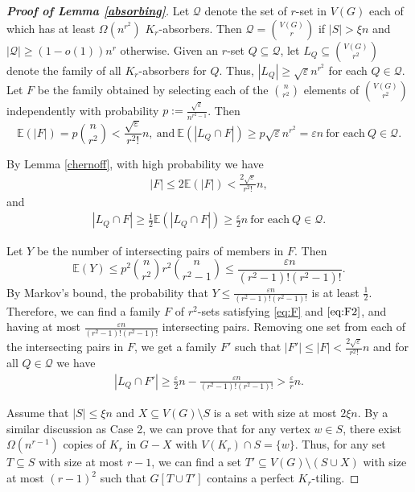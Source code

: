 \documentclass[11pt, a4paper]{article}
\theoremstyle{definition}
\newcommand{\eps}{\varepsilon}
\newcommand{\<}{\subseteq}
\begin{document}
\begin{proof}[\bf Proof of Lemma \ref{absorbing}]
Let $\mathcal{Q}$ denote the set of $r$-set in $V(G)$ each of which has at least $\Omega(n^{r^2})$ $K_r$-absorbers. Then $\mathcal{Q}=\binom{V(G)}{r}$ if $|S|>\xi n$ and  $|\mathcal{Q}|\geq (1-o(1))n^r$ otherwise. Given an $r$-set $Q\subseteq \mathcal{Q}$, let $L_Q\subseteq \binom{V(G)}{r^2}$ denote the family of all $K_r$-absorbers for $Q$. Thus, $|L_Q|\geq \sqrt{\eps} n^{r^2}$ for each $Q\in \mathcal{Q}$. Let $F$ be the family obtained by selecting each of the $\binom{n}{r^2}$ elements of $\binom{V(G)}{r^2}$ independently with probability $p:=\frac{\sqrt{\eps}}{n^{r^2-1}}$. Then  
$$
\mathbb{E}(|F|)=p\binom{n}{r^2}<\frac{\sqrt{\eps}}{r^2!}n,\ \text{and}\ \mathbb{E}(|L_Q\cap F|)\geq p\sqrt{\eps} n^{r^2}=\eps n\ \text{for each}\ Q\in \mathcal{Q}.
$$

By Lemma \ref{chernoff}, with high probability we have
\begin{align}\label{eq:F}
    |F|\leq 2\mathbb{E}(|F|)<\frac{2\sqrt{\eps}}{r^2!}n,
\end{align}
and 
\begin{align}\label{eq:F2}
    |L_Q\cap F|\geq \frac{1}{2}\mathbb{E}(|L_Q\cap F|)\geq \frac{\eps}{2}n \ \text{for each}\ Q\in \mathcal{Q}.
\end{align}


Let $Y$ be the number of intersecting pairs of members in $F$. Then 
$$
\mathbb{E}(Y)\leq p^2\binom{n}{r^2}r^2\binom{n}{r^2-1}\leq \frac{\eps n}{(r^2-1)!(r^2-1)!}.
$$
By Markov's bound, the probability that $Y\leq \frac{\eps n}{(r^2-1)!(r^2-1)!}$ is at least $\frac{1}{2}$. Therefore, we can find a family $F$ of $r^2$-sets satisfying \eqref{eq:F} and $\eqref{eq:F2}$, and having at most $\frac{\eps n}{(r^2-1)!(r^2-1)!}$ intersecting pairs. Removing %
one set from each of the intersecting pairs in $F$, we get a family $F'$ %
such that $|F'|\leq |F|< \frac{2\sqrt{\eps}}{r^2!}n$ and for all $Q\in \mathcal{Q}$ we have
\begin{align}\label{eq:F3}
    |L_Q\cap F'|\geq \frac{\eps}{2}n-\frac{\eps n}{(r^2-1)!(r^2-1)!}>\frac{\eps}{r}n.
\end{align}

Assume that $|S|\leq \xi n$ and $X\subseteq V(G)\setminus S$ is a set with size at most $2\xi n$. By a similar discussion as Case 2, we can prove that for any vertex $w\in S$, there exist $\Omega(n^{r-1})$ copies of $K_r$ in $G-X$ with $V(K_r)\cap S=\{w\}$. Thus, for any set $T\subseteq S$ with size at most $r-1$, we can find a set $T'\subseteq V(G)\setminus (S\cup X)$ with size at most $(r-1)^2$ such that $G[T\cup T']$ contains a perfect $K_r$-tiling.


\end{proof}
\end{document}
